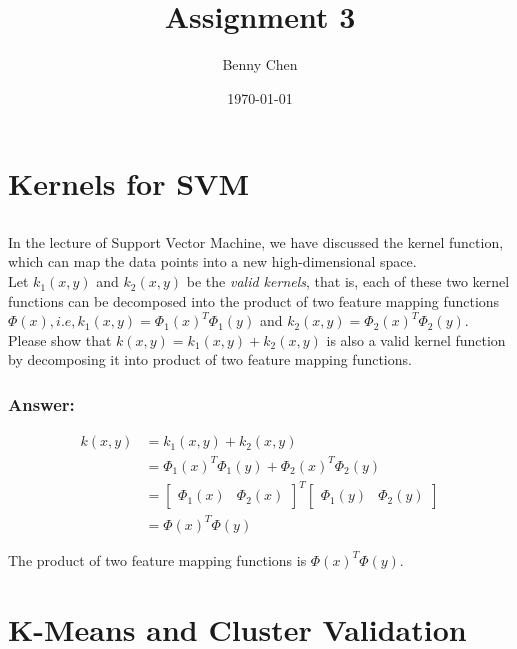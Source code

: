 \documentclass{article}
\title{Assignment 3}
\author{Benny Chen}
\date{\today}
\begin{document}
\maketitle

\section{Kernels for SVM}

\subsection{}
In the lecture of Support Vector Machine, we have discussed the kernel function, which can map the data points into a new high-dimensional space.
\\
Let $k_1(x,y)$ and $k_2(x,y)$ be the \textit{valid kernels}, that is, each of these two kernel functions can be decomposed into the product of two feature mapping functions $\Phi (x), i.e, k_1(x,y) = \Phi_1 {(x)}^T \Phi_1 (y)$ and $k_2(x,y) = \Phi_2 {(x)}^T \Phi_2 (y)$.
\\
Please show that $k(x,y) = k_1(x,y) + k_2(x,y)$ is also a valid kernel function by decomposing it into product of two feature mapping functions.

\subsubsection*{Answer:}

\begin{align*}
    k(x,y) &= k_1(x,y) + k_2(x,y) \\
    &= \Phi_1 {(x)}^T \Phi_1 (y) + \Phi_2 {(x)}^T \Phi_2 (y) \\
    &= \begin{bmatrix}
        \Phi_1 {(x)} & \Phi_2 {(x)}
    \end{bmatrix}^T
    \begin{bmatrix}
        \Phi_1 {(y)} & \Phi_2 {(y)}
    \end{bmatrix} \\
    &= \Phi {(x)}^T \Phi (y)
\end{align*}

The product of two feature mapping functions is $\Phi {(x)}^T \Phi (y)$.


\section{K-Means and Cluster Validation}
\end{document}
